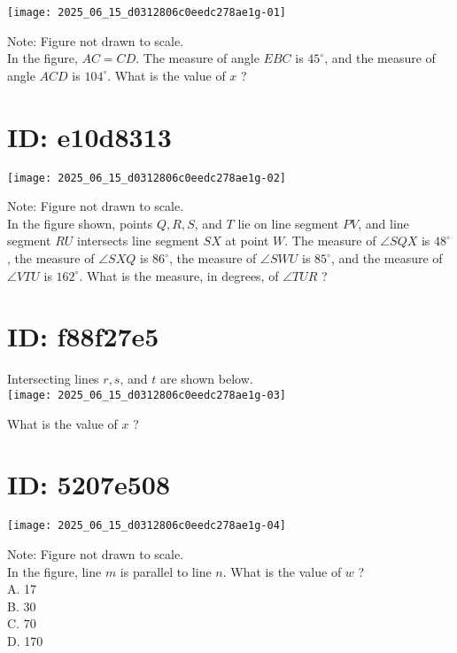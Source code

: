 
\begin{center}
\texttt{[image: 2025\_06\_15\_d0312806c0eedc278ae1g-01]}
\end{center}

Note: Figure not drawn to scale.\\
In the figure, $A C=C D$. The measure of angle $E B C$ is $45^{\circ}$, and the measure of angle $A C D$ is $104^{\circ}$. What is the value of $x$ ?

\section*{ID: e10d8313}
\begin{center}
\texttt{[image: 2025\_06\_15\_d0312806c0eedc278ae1g-02]}
\end{center}

Note: Figure not drawn to scale.\\
In the figure shown, points $Q, R, S$, and $T$ lie on line segment $P V$, and line segment $R U$ intersects line segment $S X$ at point $W$. The measure of $\angle S Q X$ is $48^{\circ}$, the measure of $\angle S X Q$ is $86^{\circ}$, the measure of $\angle S W U$ is $85^{\circ}$, and the measure of $\angle V T U$ is $162^{\circ}$. What is the measure, in degrees, of $\angle T U R$ ?

\section*{ID: f88f27e5}
Intersecting lines $r, s$, and $t$ are shown below.\\
\texttt{[image: 2025\_06\_15\_d0312806c0eedc278ae1g-03]}

What is the value of $x$ ?

\section*{ID: 5207e508}
\begin{center}
\texttt{[image: 2025\_06\_15\_d0312806c0eedc278ae1g-04]}
\end{center}

Note: Figure not drawn to scale.\\
In the figure, line $m$ is parallel to line $n$. What is the value of $w$ ?\\
A. 17\\
B. 30\\
C. 70\\
D. 170

